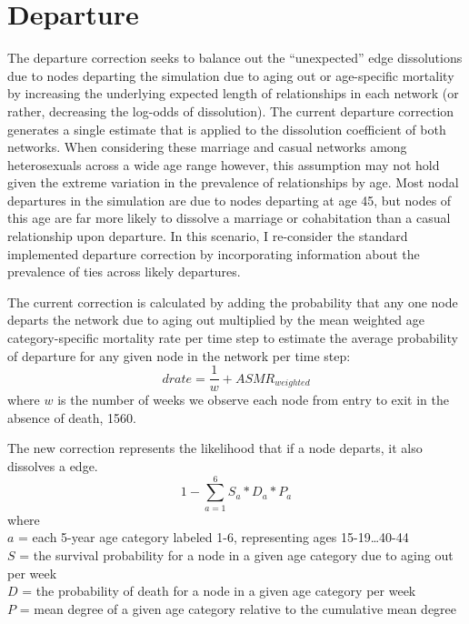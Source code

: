 \documentclass [11pt, proquest] {uwthesis}[2015/03/03]
\begin{document}
\hypertarget{departure}{%
\section{Departure}\label{departure}}

The departure correction seeks to balance out the ``unexpected'' edge dissolutions due to nodes departing the simulation due to aging out or age-specific mortality by increasing the underlying expected length of relationships in each network (or rather, decreasing the log-odds of dissolution). The current departure correction generates a single estimate that is applied to the dissolution coefficient of both networks. When considering these marriage and casual networks among heterosexuals across a wide age range however, this assumption may not hold given the extreme variation in the prevalence of relationships by age. Most nodal departures in the simulation are due to nodes departing at age 45, but nodes of this age are far more likely to dissolve a marriage or cohabitation than a casual relationship upon departure. In this scenario, I re-consider the standard implemented departure correction by incorporating information about the prevalence of ties across likely departures.

The current correction is calculated by adding the probability that any one node departs the network due to aging out multiplied by the mean weighted age category-specific mortality rate per time step to estimate the average probability of departure for any given node in the network per time step:\\
\[drate = \frac{1}{w} + ASMR_{weighted}\] where \(w\) is the number of weeks we observe each node from entry to exit in the absence of death, 1560.

The new correction represents the likelihood that if a node departs, it also dissolves a edge.
\[1-\sum_{a=1}^{6} S_a*D_a*P_a\] where\\
\(a\) = each 5-year age category labeled 1-6, representing ages 15-19\ldots40-44\\
\(S\) = the survival probability for a node in a given age category due to aging out per week\\
\(D\) = the probability of death for a node in a given age category per week\\
\(P\) = mean degree of a given age category relative to the cumulative mean degree
\end{document}
